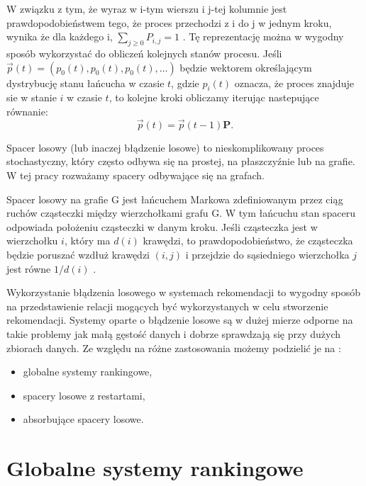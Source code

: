 W związku z tym, że wyraz w i-tym wierszu i j-tej kolumnie jest prawdopodobieństwem tego, że proces przechodzi z i do j w jednym kroku, wynika że dla każdego i, $\sum_{j\ge0} P_{i,j}=1$ \cite{Metodyksiazka}. Tę reprezentację można w wygodny sposób wykorzystać do obliczeń kolejnych stanów procesu. Jeśli $\overrightarrow{p}(t)=(p_0(t),p_0(t),p_0(t),\dots )$  będzie wektorem określającym dystrybucję stanu łańcucha w czasie $t$, gdzie $p_i(t)$ oznacza, że proces znajduje sie w stanie $i$ w czasie $t$, to kolejne kroki obliczamy iterując nastepujące równanie:
\begin{equation}
    \overrightarrow{p}(t)=\overrightarrow{p}(t-1)\bm{P}.
\end{equation}


Spacer losowy (lub inaczej błądzenie losowe) to nieskomplikowany proces stochastyczny, który często odbywa się na prostej, na płaszczyźnie lub na grafie. W tej pracy rozważamy spacery odbywające się na grafach.
\begin{definition}\label{def:spacer}
Spacer losowy na grafie G jest łańcuchem Markowa zdefiniowanym przez ciąg ruchów cząsteczki między wierzchołkami grafu G. W tym łańcuchu stan spaceru odpowiada położeniu cząsteczki w danym kroku. Jeśli cząsteczka jest w wierzchołku $i$, który ma $d(i)$ krawędzi, to prawdopodobieństwo, że cząsteczka będzie poruszać wzdłuż krawędzi $(i, j)$ i przejdzie do sąsiedniego wierzchołka $j$ jest równe $1/d(i)$ .
\end{definition}

Wykorzystanie błądzenia losowego w systemach rekomendacji to wygodny sposób na przedstawienie relacji mogących być wykorzystanych w celu stworzenie rekomendacji. Systemy oparte o błądzenie losowe są w dużej mierze odporne na takie problemy jak małą gęstość danych i dobrze sprawdzają się przy dużych zbiorach danych. Ze względu na różne zastosowania możemy podzielić je na \cite{RecommenderASurvey} :
\begin{itemize}
    \item globalne systemy rankingowe,
    \item spacery losowe z restartami,
    \item absorbujące spacery losowe.
\end{itemize}


\section{Globalne systemy rankingowe}


